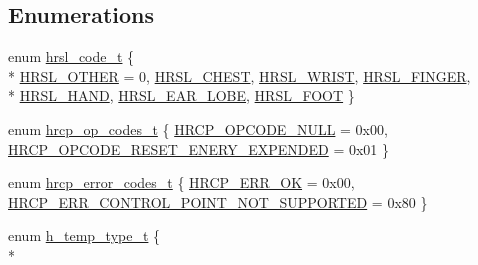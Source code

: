 \subsection*{Enumerations}
\begin{DoxyCompactItemize}
\item 
enum \hyperlink{group___enumeration_ga142ef314a313f7071c544be2939c13a3}{hrsl\-\_\-code\-\_\-t} \{ \\*
\hyperlink{group___enumeration_gga142ef314a313f7071c544be2939c13a3a1fef127f1d4f2ed5625f5cf201319869}{H\-R\-S\-L\-\_\-\-O\-T\-H\-E\-R} = 0, 
\hyperlink{group___enumeration_gga142ef314a313f7071c544be2939c13a3a6646a23f8ba502cee080a9a747349dae}{H\-R\-S\-L\-\_\-\-C\-H\-E\-S\-T}, 
\hyperlink{group___enumeration_gga142ef314a313f7071c544be2939c13a3a69db22e836192e959df20b9d7e322460}{H\-R\-S\-L\-\_\-\-W\-R\-I\-S\-T}, 
\hyperlink{group___enumeration_gga142ef314a313f7071c544be2939c13a3a677a2bce35979f3240d4c031b4504b3e}{H\-R\-S\-L\-\_\-\-F\-I\-N\-G\-E\-R}, 
\\*
\hyperlink{group___enumeration_gga142ef314a313f7071c544be2939c13a3a374b43fb17807d51232d35ef7b53dd5f}{H\-R\-S\-L\-\_\-\-H\-A\-N\-D}, 
\hyperlink{group___enumeration_gga142ef314a313f7071c544be2939c13a3a500c23539eeecc80f5d0895db91dee94}{H\-R\-S\-L\-\_\-\-E\-A\-R\-\_\-\-L\-O\-B\-E}, 
\hyperlink{group___enumeration_gga142ef314a313f7071c544be2939c13a3a3d7f638193a65fda264d54f05ee0275f}{H\-R\-S\-L\-\_\-\-F\-O\-O\-T}
 \}
\item 
enum \hyperlink{group___enumeration_ga05f649a99eaf5a7d66679d1b1d30c2e3}{hrcp\-\_\-op\-\_\-codes\-\_\-t} \{ \hyperlink{group___enumeration_gga05f649a99eaf5a7d66679d1b1d30c2e3a6dc2044db07e52a55ab5d9b2f4b520ba}{H\-R\-C\-P\-\_\-\-O\-P\-C\-O\-D\-E\-\_\-\-N\-U\-L\-L} = 0x00, 
\hyperlink{group___enumeration_gga05f649a99eaf5a7d66679d1b1d30c2e3ad8b7d6844bd068d48dd91bb711719f98}{H\-R\-C\-P\-\_\-\-O\-P\-C\-O\-D\-E\-\_\-\-R\-E\-S\-E\-T\-\_\-\-E\-N\-E\-R\-Y\-\_\-\-E\-X\-P\-E\-N\-D\-E\-D} = 0x01
 \}
\item 
enum \hyperlink{group___enumeration_ga5daf78dd74d394978ce4ceda96dd7492}{hrcp\-\_\-error\-\_\-codes\-\_\-t} \{ \hyperlink{group___enumeration_gga5daf78dd74d394978ce4ceda96dd7492a6dc6b7445a9e853714c84fb090fdf291}{H\-R\-C\-P\-\_\-\-E\-R\-R\-\_\-\-O\-K} = 0x00, 
\hyperlink{group___enumeration_gga5daf78dd74d394978ce4ceda96dd7492a7940ba0f1405e01e785b902274d80ff1}{H\-R\-C\-P\-\_\-\-E\-R\-R\-\_\-\-C\-O\-N\-T\-R\-O\-L\-\_\-\-P\-O\-I\-N\-T\-\_\-\-N\-O\-T\-\_\-\-S\-U\-P\-P\-O\-R\-T\-E\-D} = 0x80
 \}
\item 
enum \hyperlink{group___enumeration_ga7fa712ec2096ff24507538b50e2f51e0}{h\-\_\-temp\-\_\-type\-\_\-t} \{ \\*

\end{DoxyCompactItemize}
